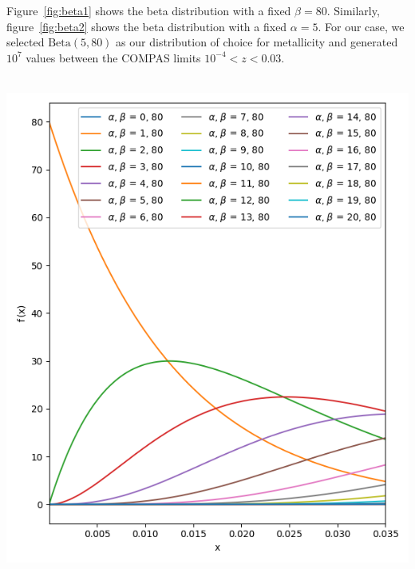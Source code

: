 Figure~\ref{fig:beta1} shows the beta distribution with a fixed $\beta=80$.
Similarly, figure~\ref{fig:beta2} shows the beta distribution with a fixed $\alpha=5$.
For our case, we selected $\text{Beta}(5, 80)$ as our distribution of choice for metallicity and generated $10^7$ values between the COMPAS limits $10^{-4} < z < 0.03$.
\,\\\,\\
\begin{minipage}[l]{0.48\columnwidth}
    \centering
    \includegraphics[width=\linewidth]{images/beta1}
    \label{fig:beta1}
\end{minipage}
\hfill
